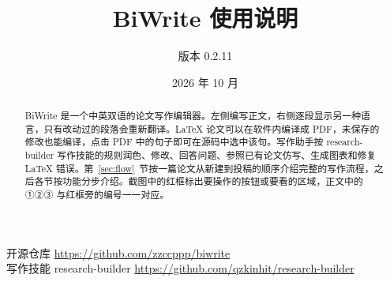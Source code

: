 \documentclass[UTF8,a4paper,11pt]{ctexart}
\title{\textbf{BiWrite 使用说明}}
\author{版本 0.2.11}
\date{2026 年 10 月}
\begin{document}
\maketitle
\thispagestyle{empty}

\begin{center}
开源仓库 \url{https://github.com/zzccppp/biwrite}\\[2pt]
写作技能 research-builder \url{https://github.com/qzkinhit/research-builder}
\end{center}

\begin{abstract}
BiWrite 是一个中英双语的论文写作编辑器。左侧编写正文，右侧逐段显示另一种语言，只有改动过的段落会重新翻译。LaTeX 论文可以在软件内编译成 PDF，未保存的修改也能编译，点击 PDF 中的句子即可在源码中选中该句。写作助手按 research-builder 写作技能的规则润色、修改、回答问题、参照已有论文仿写、生成图表和修复 LaTeX 错误。第~\ref{sec:flow}~节按一篇论文从新建到投稿的顺序介绍完整的写作流程，之后各节按功能分步介绍。截图中的红框标出要操作的按钮或要看的区域，正文中的 ①②③ 与红框旁的编号一一对应。
\end{abstract}
\end{document}
